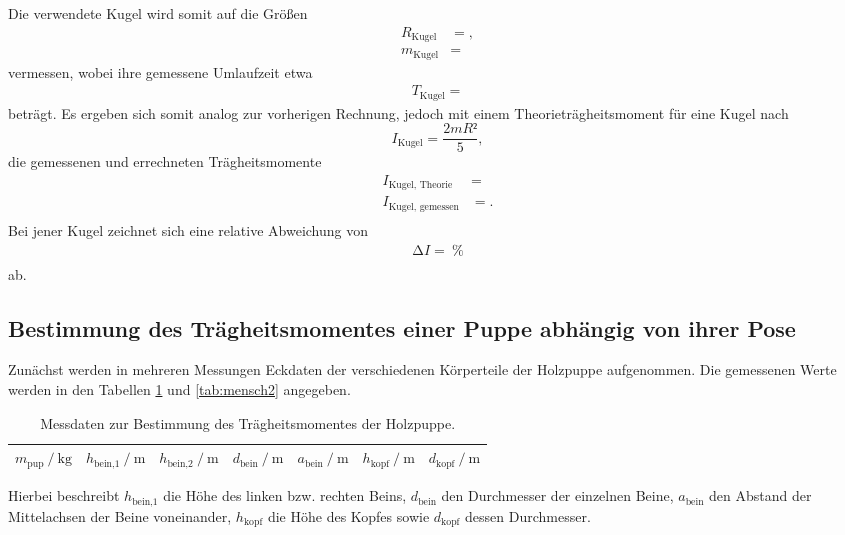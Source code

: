 Die verwendete Kugel wird somit auf die Größen
\begin{align*}
  R_{\text{Kugel}} &= , \\
  m_{\text{Kugel}} &= 
\end{align*}
vermessen, wobei ihre gemessene Umlaufzeit etwa
\begin{align*}
  T_{\text{Kugel}} = 
\end{align*}
beträgt.
Es ergeben sich somit analog zur vorherigen Rechnung, jedoch mit einem Theorieträgheitsmoment für eine Kugel nach
\begin{equation}
  I_{\text{Kugel}} = \frac{2mR²}{5},
\end{equation}
die gemessenen und errechneten Trägheitsmomente
\begin{align*}
  I_{\text{Kugel, Theorie}}  &=  \\
  I_{\text{Kugel, gemessen}} &= . \\
\end{align*}
Bei jener Kugel zeichnet sich eine relative Abweichung von
\begin{align*}
  \increment I =  \:\si{\percent}\\
\end{align*}
ab.


\subsection{Bestimmung des Trägheitsmomentes einer Puppe abhängig von ihrer Pose}
Zunächst werden in mehreren Messungen Eckdaten der verschiedenen Körperteile der Holzpuppe aufgenommen.
Die gemessenen Werte werden in den Tabellen \ref{tab:mensch} und \ref{tab:mensch2} angegeben.

\begin{table}[H]
  \centering
  \caption{Messdaten zur Bestimmung des Trägheitsmomentes der Holzpuppe.}
  \label{tab:mensch}
  \begin{tabular}{c c c c c c c}
    \toprule
    {$m_\text{pup} \ /\ \si{\kilo\gram} $} & {$h_\text{bein,1} \ /\ \si{\metre}$} & {$h_\text{bein,2} \ /\  \si{\metre}$} & {$d_\text{bein} \ /\  \si{\metre}$} & {$a_\text{bein} \ /\ \si{\metre}$} & {$h_\text{kopf} \ /\ \si{\metre}$} & {$d_\text{kopf} \ /\  \si{\metre}$}  \\
    \midrule
    
    \bottomrule
  \end{tabular}
\end{table}
Hierbei beschreibt $h_\text{bein,1}$ die Höhe des linken bzw. rechten Beins, $d_\text{bein}$ den Durchmesser der einzelnen Beine, $a_\text{bein}$ den Abstand der Mittelachsen der Beine voneinander, $h_\text{kopf}$ die Höhe des Kopfes sowie $d_\text{kopf}$ dessen Durchmesser.

